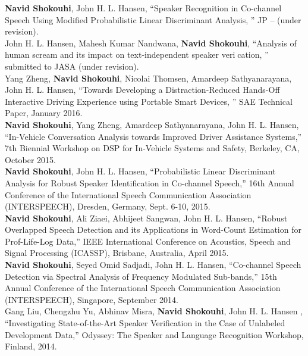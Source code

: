 \documentclass[doublespacing]{utdthesis}
\begin{document}
\begin{vita}
{\bf Navid Shokouhi}, John H. L. Hansen, ``Speaker Recognition in Co-channel Speech Using Modified Probabilistic Linear Discriminant Analysis, '' JP -- (under revision).\\

John H. L. Hansen, Mahesh Kumar Nandwana, {\bf Navid Shokouhi}, ``Analysis of human scream
and its impact on text-independent speaker verication, '' submitted to JASA (under revision).\\

Yang Zheng, {\bf Navid Shokouhi}, Nicolai Thomsen, Amardeep Sathyanarayana, John H. L. Hansen, ``Towards Developing a Distraction-Reduced Hands-Off Interactive Driving Experience using Portable Smart Devices, '' SAE Technical Paper, January 2016. \\

{\bf Navid Shokouhi}, Yang Zheng, Amardeep Sathyanarayana, John H. L. Hansen, ``In-Vehicle Conversation Analysis towards Improved Driver Assistance Systems,'' 7th Biennial Workshop on DSP for In-Vehicle Systems and Safety, Berkeley, CA, October 2015.\\

{\bf Navid Shokouhi}, John H. L. Hansen, ``Probabilistic Linear Discriminant Analysis for Robust Speaker Identification in Co-channel Speech,'' 16th Annual Conference of the International Speech Communication Association (INTERSPEECH), Dresden, Germany, Sept. 6-10, 2015.\\

{\bf Navid Shokouhi}, Ali Ziaei, Abhijeet Sangwan, John H. L. Hansen, ``Robust Overlapped Speech Detection and its Applications in Word-Count Estimation for Prof-Life-Log Data,'' IEEE International Conference on Acoustics, Speech and Signal Processing (ICASSP), Brisbane, Australia, April 2015. \\

{\bf Navid Shokouhi}, Seyed Omid Sadjadi, John H. L. Hansen, ``Co-channel Speech Detection via Spectral Analysis of Frequency Modulated Sub-bands,'' 15th Annual Conference of the International Speech Communication Association (INTERSPEECH), Singapore, September 2014.\\

Gang Liu, Chengzhu Yu, Abhinav Misra, {\bf Navid Shokouhi}, John H. L. Hansen , ``Investigating State-of-the-Art Speaker Verification in the Case of Unlabeled Development Data,'' Odyssey: The Speaker and Language Recognition Workshop, Finland, 2014.\\


\end{vita}
\end{document}
